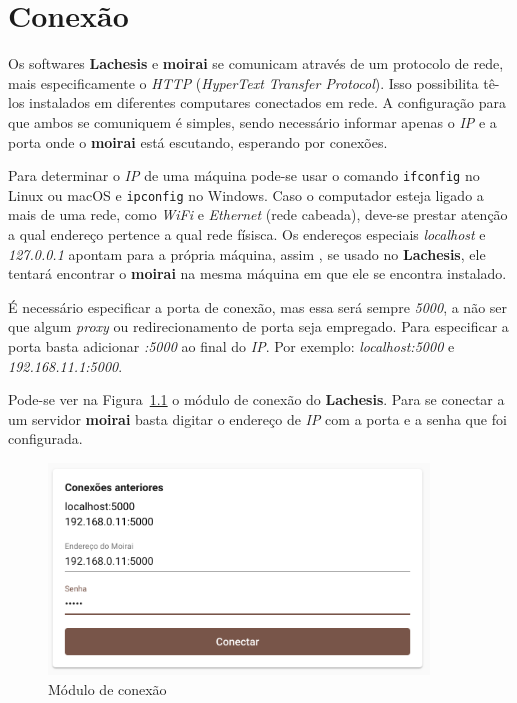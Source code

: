 
\chapter{Conexão}%
\label{chapter:connection}

Os softwares \textbf{Lachesis} e \textbf{moirai} se comunicam através de um
protocolo de rede, mais especificamente o \textit{HTTP} (\textit{HyperText
Transfer Protocol}). Isso possibilita tê-los instalados em diferentes computares
conectados em rede. A configuração para que ambos se comuniquem é simples, sendo
necessário informar apenas o \textit{IP} e a porta onde o \textbf{moirai} está
escutando, esperando por conexões.

Para determinar o \textit{IP} de uma máquina pode-se usar o comando
\texttt{ifconfig} no Linux ou macOS e \texttt{ipconfig} no
Windows. Caso o computador esteja ligado a mais de uma rede, como \textit{WiFi}
e \textit{Ethernet} (rede cabeada), deve-se prestar atenção a qual endereço
pertence a qual rede físisca. Os endereços especiais \textit{localhost} e
\textit{127.0.0.1} apontam para a própria máquina, assim , se usado no
\textbf{Lachesis}, ele tentará encontrar o \textbf{moirai} na mesma máquina em
que ele se encontra instalado.

É necessário especificar a porta de conexão, mas essa será sempre \textit{5000},
a não ser que algum \textit{proxy} ou redirecionamento de porta seja empregado.
Para especificar a porta basta adicionar \textit{:5000} ao final do \textit{IP}.
Por exemplo: \textit{localhost:5000} e \textit{192.168.11.1:5000}.

Pode-se ver na Figura~\ref{fig:connect} o módulo de conexão do
\textbf{Lachesis}. Para se conectar a um servidor \textbf{moirai} basta digitar
o endereço de \textit{IP} com a porta e a senha que foi configurada.

\begin{figure}[ht!]
    \centering
    \includegraphics[width=0.9\textwidth]{imgs/connect}
    \caption[Módulo de conexão]{Módulo de conexão}%
    \label{fig:connect}
\end{figure}

